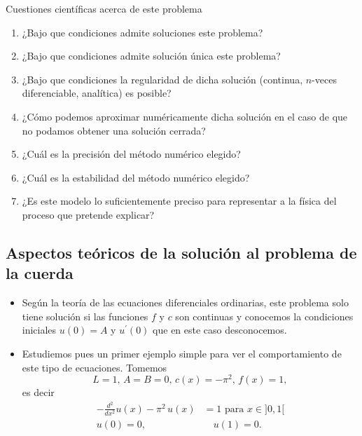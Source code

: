 \documentclass[10pt,handout]{beamer}
\theoremstyle{plain} %
\theoremstyle{plain} %
\theoremstyle{plain} %
\theoremstyle{plain} %
\theoremstyle{definition}
\theoremstyle{example}
\theoremstyle{example}
\theoremstyle{remark}
\theoremstyle{remark}
\begin{document}
\begin{frame}
\begin{block}{Cuestiones científicas acerca de este problema}
\begin{enumerate}
\item ¿Bajo que condiciones admite soluciones este problema?
\item ¿Bajo que condiciones admite solución única este problema?
\item ¿Bajo que condiciones la regularidad de dicha solución (continua, $n$-veces diferenciable, analítica) es posible?
\item ¿Cómo podemos aproximar numéricamente dicha solución en el caso de que no 
podamos obtener una solución cerrada?
\item ¿Cuál es la precisión del método numérico elegido?
\item ¿Cuál es la estabilidad del método numérico elegido?
\item ¿Es este modelo lo suficientemente preciso para representar a la física del proceso que pretende explicar?
\end{enumerate}
\end{block}
\end{frame}

\subsection{Aspectos teóricos de la solución al problema de la cuerda}

\begin{frame}
\begin{itemize}
\item Según la teoría de las ecuaciones diferenciales ordinarias, este problema solo tiene solución si las funciones $f$ y $c$ son continuas y conocemos la condiciones iniciales $u(0)=A$ y
$u^{\prime}(0)$ que en este caso desconocemos.
\item Estudiemos pues un primer ejemplo simple para ver el comportamiento de este tipo de ecuaciones.
Tomemos
$$
L =1,\, A = B = 0,\, c(x)=-\pi^2, \, f(x) = 1,
$$
es decir
\begin{align}
- \frac{d^2}{dx^2}u(x) - \pi^2 \,u(x) & = 1 \text{ para } x \in ]0,1[ \label{eqA} \\
u(0)=0, & \quad u(1)=0. \label{eqB}
\end{align}
\end{itemize}
\end{frame}
\end{document}
